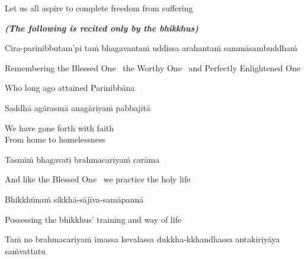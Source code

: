 \begin{english}
  Let us all aspire to complete freedom from suffering
\end{english}

\suttaRef{[SN 22.80]}

\ifninebythirteen\vspace{0.5em}\fi


\begin{center}
  \textit{\textbf{(The following is recited only by the bhikkhus)}}
\end{center}

\begin{pali-hang}
  Cira-parinibbutam'pi taṁ bhagavantaṁ uddissa arahantaṁ sammāsambuddhaṁ
\end{pali-hang}

\begin{english-hang}
  Remembering the Blessed One \breathmark\ the Worthy One \breathmark\ and Perfectly Enlightened One\\
\end{english-hang}

\begin{english}
  Who long ago attained Parinibbāna
\end{english}

Saddhā agārasmā anagāriyaṁ pabbajitā

\begin{english}
  We have gone forth with faith\\
  From home to homelessness
\end{english}

Tasmiṁ bhagavati brahmacariyaṁ carāma

\begin{english}
  And like the Blessed One \breathmark\ we practice the holy life
\end{english}

Bhikkhūnaṁ sikkhā-sājīva-samāpannā

\begin{english}
  Possessing the bhikkhus' training and way of life\ifdigital\makeatletter\hyperlink{endnote28-appendix}\makeatother\fi
\end{english}

\begin{pali-hang}
  Taṁ no brahmacariyaṁ imassa kevalassa dukkha-kkhandhassa antakiriyāya saṁvattatu
\end{pali-hang}

